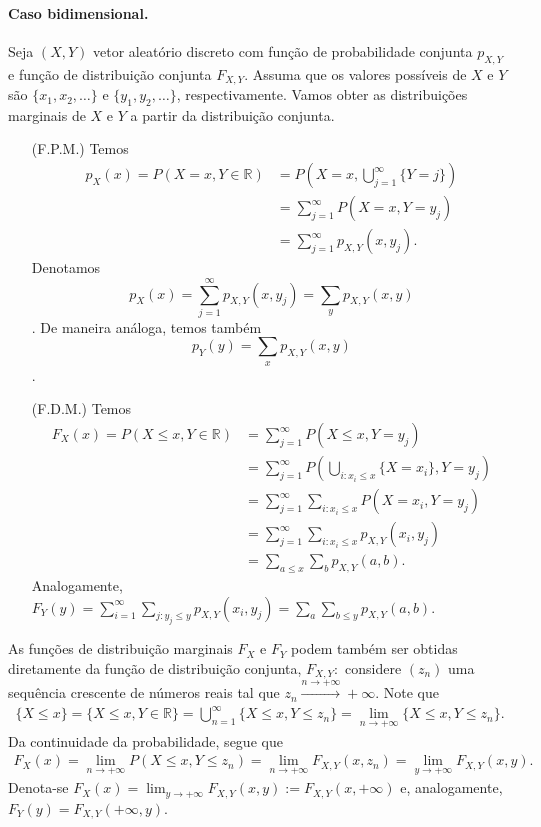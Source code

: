 \documentclass[../Notas.tex]{subfiles}
\begin{document}
\paragraph{Caso bidimensional.} Seja $(X,Y)$ vetor aleatório discreto com função de probabilidade conjunta $p_{X,Y}$ e função de distribuição conjunta $F_{X,Y}$. Assuma que os valores possíveis de $X$ e $Y$ são $\{x_1, x_2, \dots\}$ e $\{y_1, y_2, \dots\}$, respectivamente. Vamos obter as distribuições marginais de $X$ e $Y$ a partir da distribuição conjunta.
\begin{itemize}
    \item[(F.P.M.)] Temos
    \begin{align*}
        p_X(x) = P(X=x, Y\in\mathbb{R}) &= P\left( X=x, \bigcup_{j=1}^{\infty}\{Y=j\} \right) \\
        &= \sum_{j=1}^{\infty} P(X=x, Y=y_j) \\
        &= \sum_{j=1}^{\infty} p_{X,Y}(x, y_j).
    \end{align*}
    Denotamos $$\displaystyle{ p_X(x) = \sum_{j=1}^{\infty} p_{X,Y}(x, y_j) = \sum_y p_{X,Y}(x,y) }$$. De maneira análoga, temos também $$\displaystyle{ p_Y(y) = \sum_x p_{X,Y}(x,y) }$$.
    \item[(F.D.M.)] Temos
    \begin{align*}
        F_X(x) = P(X\leq x, Y\in\mathbb{R}) &= \sum_{j=1}^{\infty} P(X\leq x, Y=y_j) \\
        &= \sum_{j=1}^{\infty} P\left( \bigcup_{i : x_i\leq x}\{X=x_i\}, Y=y_j \right) \\
        &= \sum_{j=1}^{\infty}\sum_{i: x_i\leq x} P(X=x_i, Y=y_j) \\
        &= \sum_{j=1}^{\infty}\sum_{i: x_i\leq x} p_{X,Y}(x_i,y_j) \\
        &= \sum_{a\leq x}\sum_{b} p_{X,Y}(a,b).
    \end{align*}
    Analogamente, $\displaystyle{ F_Y(y) = \sum_{i=1}^{\infty}\sum_{j: y_j\leq y} p_{X,Y}(x_i,y_j) =\sum_{a}\sum_{b\leq y} p_{X,Y}(a,b) }.$
\end{itemize}

As funções de distribuição marginais $F_X$ e $F_Y$ podem também ser obtidas diretamente da função de distribuição conjunta, $F_{X,Y}:$ considere $(z_n)$ uma sequência crescente de números reais tal que $z_n\xrightarrow{n\to +\infty}+\infty$. Note que
\begin{align*}
    \{ X\leq x \} = \{ X\leq x, Y\in\mathbb{R} \} = \bigcup_{n=1}^{\infty} \{ X\leq x, Y\leq z_n \} = \lim_{n\to +\infty} \{ X\leq x, Y\leq z_n \}.
\end{align*}
Da continuidade da probabilidade, segue que
\begin{align*}
    F_X(x) = \lim_{n\to +\infty} P(X\leq x, Y\leq z_n) = \lim_{n\to +\infty} F_{X,Y}(x, z_n) = \lim_{y\to +\infty} F_{X, Y}(x,y).
\end{align*}
Denota-se $F_X(x) = \displaystyle{\lim_{y\to +\infty} F_{X,Y}(x,y) := F_{X, Y}(x, +\infty)}$ e, analogamente, $F_Y(y) = \displaystyle{F_{X, Y}(+\infty, y)}$.
\end{document}
